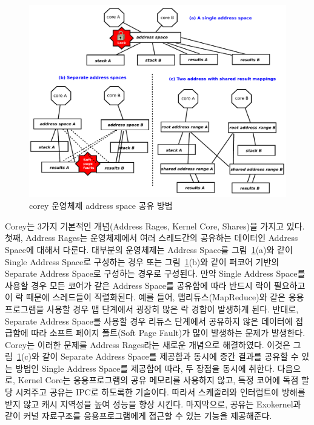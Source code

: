 \begin{figure}[h!]
    \centering
    \includegraphics[width=1\textwidth]{fig/corey/corey}
    \caption{corey 운영체제 address space 공유 방법}
  \label{fig:corey}
\end{figure}

Corey는 3가지 기본적인 개념(Address Rages, Kernel Core, Shares)을 가지고 있다. 
첫째, Address Rages는 운영체제에서 여러 스레드간의 공유하는 데이터인 Address Space에 대해서 다룬다.
대부분의 운영체제는 Address Space를 그림~\ref{fig:corey}(a)와 같이 Single Address Space로
구성하는 경우 또는 그림~\ref{fig:corey}(b)와 같이 퍼코어 기반의 Separate Address Space로 구성하는 경우로
구성된다. 
만약 Single Address Space를 사용할 경우 모든 코어가 같은 Address Space를 공유함에 따라 반드시 락이
필요하고 이 락 때문에 스레드들이 직렬화된다.
예를 들어, 맵리듀스(MapReduce)와 같은 응용프로그램을 사용할 경우 맵 단계에서 굉장히 많은 락 경합이 발생하게 된다.
반대로, Separate Address Space를 사용할 경우 리듀스 단계에서 공유하지 않은 데이터에 접급함에 따라 
소프트 페이지 폴트(Soft Page Fault)가 많이 발생하는 문제가 발생한다.
Corey는 이러한 문제를 Address Rages라는 새로운 개념으로 해결하였다. 
이것은 그림~\ref{fig:corey}(c)와 같이 Separate Address Space를 제공함과 동시에 중간 결과를 공유할 수 있는
방법인 Single Address Space를 제공함에 따라, 두 장점을 동시에 취한다.
다음으로, Kernel Core는 응용프로그램의 공유 메모리를 사용하지 않고, 특정 코어에 
독점 할당 시켜주고 공유는 IPC로 하도록한 기술이다. 
따라서 스케줄러와 인터럽트에 방해를 받지 않고 캐시 지역성을 높여 성능을 향상 시킨다. 
마지막으로, 공유는 Exokernel과 같이 커널 자료구조를 응용프로그램에게 접근할 수 있는 
기능을 제공해준다.


